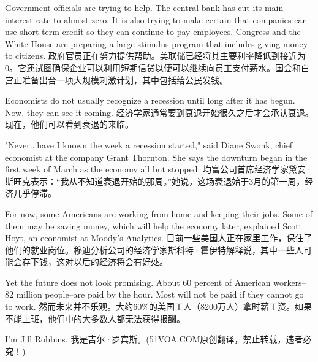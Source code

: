 Government officials are trying to help. The central bank has cut its main interest rate to almost zero. It is also trying to make certain that companies can use short-term credit so they can continue to pay employees. Congress and the White House are preparing a large stimulus program that includes giving money to citizens.
政府官员正在努力提供帮助。美联储已经将其主要利率降低到接近为0。它还试图确保企业可以利用短期信贷以便可以继续向员工支付薪水。国会和白宫正准备出台一项大规模刺激计划，其中包括给公民发钱。

Economists do not usually recognize a recession until long after it has begun. Now, they can see it coming.
经济学家通常要到衰退开始很久之后才会承认衰退。现在，他们可以看到衰退的来临。

"Never...have I known the week a recession started," said Diane Swonk, chief economist at the company Grant Thornton. She says the downturn began in the first week of March as the economy all but stopped.
均富公司首席经济学家黛安·斯旺克表示：“我从不知道衰退开始的那周。”她说，这场衰退始于3月的第一周，经济几乎停滞。

For now, some Americans are working from home and keeping their jobs. Some of them may be saving money, which will help the economy later, explained Scott Hoyt, an economist at Moody's Analytics.
目前一些美国人正在家里工作，保住了他们的就业岗位。穆迪分析公司的经济学家斯科特·霍伊特解释说，其中一些人可能会存下钱，这对以后的经济将会有好处。

Yet the future does not look promising. About 60 percent of American workers--82 million people--are paid by the hour. Most will not be paid if they cannot go to work.
然而未来并不乐观。大约60\%的美国工人（8200万人）拿时薪工资。如果不能上班，他们中的大多数人都无法获得报酬。

I'm Jill Robbins.
我是吉尔·罗宾斯。(51VOA.COM原创翻译，禁止转载，违者必究！) \\

